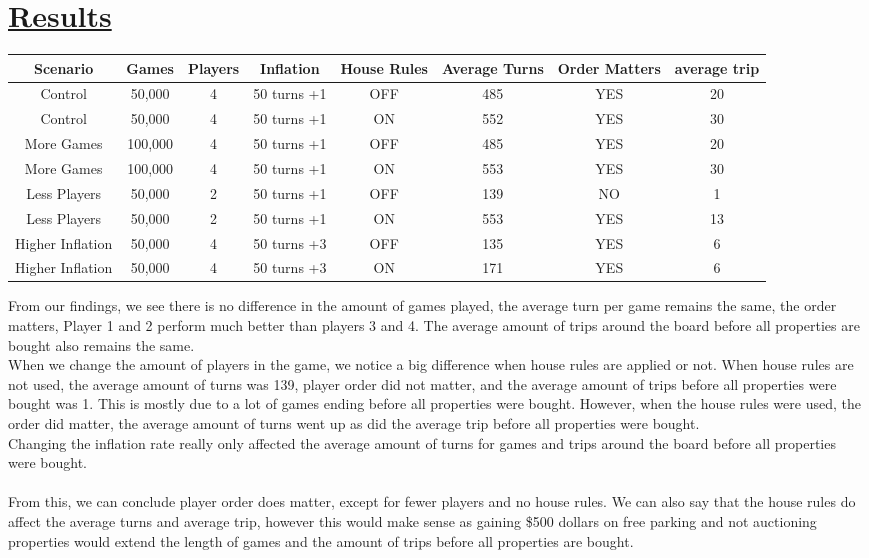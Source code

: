 \documentclass[a4paper,reqno,12pt]{report}
\begin{document}
\section*{\underline{Results}}
\begin{table}[htbp]
\begin{adjustbox}{width=\textwidth}
\begin{tabular}{ |c|c|c|c|c|c|c|c| }
\hline
Scenario & Games & Players & Inflation & House Rules & Average Turns & Order Matters & average trip\\
\hline
Control & 50,000 & 4 & 50 turns +1 & OFF & 485 & YES & 20\\ 
Control & 50,000 & 4 & 50 turns +1 & ON & 552 & YES & 30\\
\hline
More Games & 100,000 & 4 & 50 turns +1 & OFF & 485 & YES & 20\\ 
More Games & 100,000 & 4 & 50 turns +1 & ON & 553 & YES & 30\\ 
\hline
Less Players & 50,000 & 2 & 50 turns +1 & OFF & 139 & NO & 1\\ 
Less Players & 50,000 & 2 & 50 turns +1 & ON & 553 & YES & 13\\ 
\hline
Higher Inflation & 50,000 & 4 & 50 turns +3 & OFF & 135 & YES & 6\\ 
Higher Inflation & 50,000 & 4 & 50 turns +3 & ON & 171 & YES & 6\\ 
\hline
\end{tabular}
\end{adjustbox}
\end{table}
From our findings, we see there is no difference in the amount of games played, the average turn per game remains the same, the order matters, Player 1 and 2 perform much better than players 3 and 4. The average amount of trips around the board before all properties are bought also remains the same.
\\
When we change the amount of players in the game, we notice a big difference when house rules are applied or not. When house rules are not used, the average amount of turns was 139, player order did not matter, and the average amount of trips before all properties were bought was 1. This is mostly due to a lot of games ending before all properties were bought. However, when the house rules were used, the order did matter, the average amount of turns went up as did the average trip before all properties were bought.
\\
Changing the inflation rate really only affected the average amount of turns for games and trips around the board before all properties were bought.
\\
\\
From this, we can conclude player order does matter, except for fewer players and no house rules. We can also say that the house rules do affect the average turns and average trip, however this would make sense as gaining \$500 dollars on free parking and not auctioning properties would extend the length of games and the amount of trips before all properties are bought.
\end{document}

